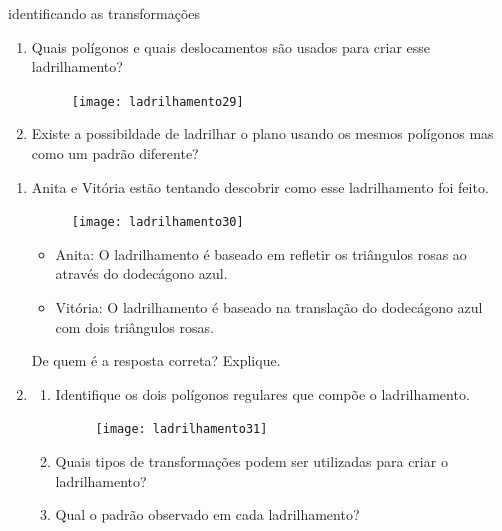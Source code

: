 \begin{task}{identificando as transformações}

\begin{enumerate}
	\item Quais polígonos e quais deslocamentos são usados para criar esse ladrilhamento?
	\begin{figure}[H]
	\centering
	\texttt{[image: ladrilhamento29]}

	\end{figure}
	\item Existe a possibildade de ladrilhar o plano usando os mesmos polígonos mas como um padrão diferente?
\end{enumerate}
\end{task}

\exercise

\begin{enumerate}

	\item Anita e Vitória estão tentando descobrir como esse ladrilhamento foi feito.

	\begin{figure}[H]
	\centering
	\texttt{[image: ladrilhamento30]}

	\end{figure}

	\begin{itemize}
	\item Anita: O ladrilhamento é baseado em refletir os triângulos rosas ao através do dodecágono azul.
	\item Vitória: O ladrilhamento é baseado na translação do dodecágono azul com dois triângulos rosas.
	\end{itemize}

	De quem é a resposta correta? Explique.


	\item 

	\begin{enumerate}
	\item Identifique os dois polígonos regulares que compõe o ladrilhamento.

	\begin{figure}[H]
	\centering
	\texttt{[image: ladrilhamento31]}

	\end{figure}
		\item Quais tipos de transformações podem ser utilizadas para criar o ladrilhamento?
		\item Qual o padrão observado em cada ladrilhamento?
	\end{enumerate}


\end{enumerate}
